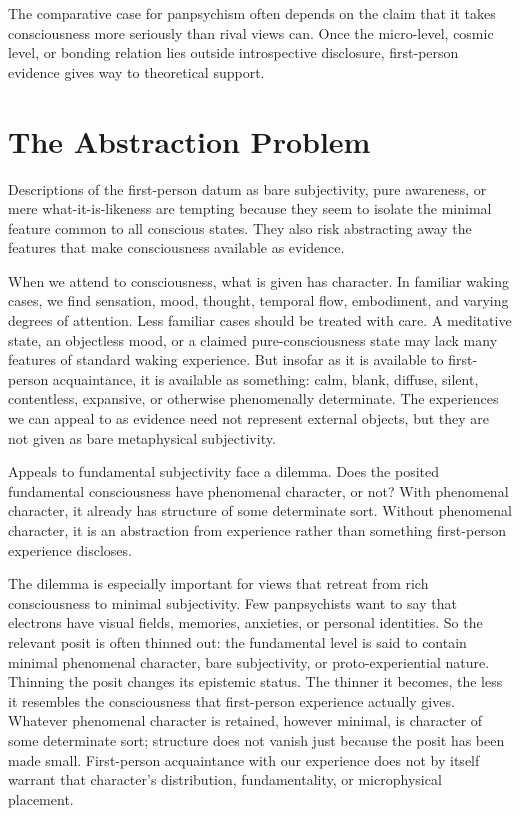 The comparative case for panpsychism often depends on the claim that it takes consciousness more seriously than rival views can. Once the micro-level, cosmic level, or bonding relation lies outside introspective disclosure, first-person evidence gives way to theoretical support.

\section{The Abstraction Problem}

Descriptions of the first-person datum as bare subjectivity, pure awareness, or mere what-it-is-likeness are tempting because they seem to isolate the minimal feature common to all conscious states. They also risk abstracting away the features that make consciousness available as evidence.

When we attend to consciousness, what is given has character. In familiar waking cases, we find sensation, mood, thought, temporal flow, embodiment, and varying degrees of attention. Less familiar cases should be treated with care. A meditative state, an objectless mood, or a claimed pure-consciousness state may lack many features of standard waking experience. But insofar as it is available to first-person acquaintance, it is available as something: calm, blank, diffuse, silent, contentless, expansive, or otherwise phenomenally determinate. The experiences we can appeal to as evidence need not represent external objects, but they are not given as bare metaphysical subjectivity.

Appeals to fundamental subjectivity face a dilemma. Does the posited fundamental consciousness have phenomenal character, or not? With phenomenal character, it already has structure of some determinate sort. Without phenomenal character, it is an abstraction from experience rather than something first-person experience discloses.

The dilemma is especially important for views that retreat from rich consciousness to minimal subjectivity. Few panpsychists want to say that electrons have visual fields, memories, anxieties, or personal identities. So the relevant posit is often thinned out: the fundamental level is said to contain minimal phenomenal character, bare subjectivity, or proto-experiential nature. Thinning the posit changes its epistemic status. The thinner it becomes, the less it resembles the consciousness that first-person experience actually gives. Whatever phenomenal character is retained, however minimal, is character of some determinate sort; structure does not vanish just because the posit has been made small. First-person acquaintance with our experience does not by itself warrant that character's distribution, fundamentality, or microphysical placement.

